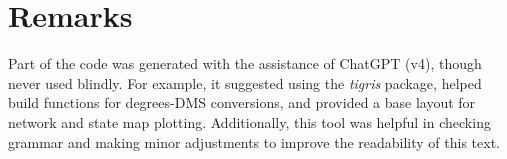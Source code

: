 

\chapter*{Remarks}
Part of the code was generated with the assistance of ChatGPT (v4), though never used blindly. For example, it suggested using the \textsl{tigris} package, helped build functions for degrees-DMS conversions, and provided a base layout for network and state map plotting. Additionally, this tool was helpful in checking grammar and making minor adjustments to improve the readability of this text.





